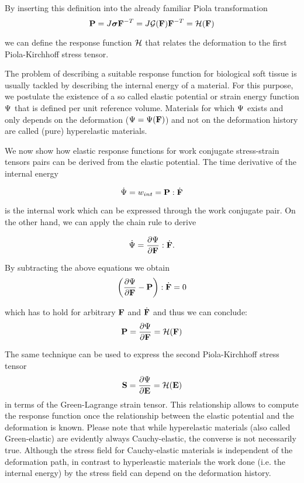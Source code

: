 By inserting this definition into the already familiar Piola transformation 
 \begin{equation}
\mathbf {P}  = J \boldsymbol{\sigma} \mathbf {F } ^{-T} =   J \mathcal{G}(\mathbf {F }) \mathbf {F } ^{-T} = \mathcal H  (\mathbf {F })
\end{equation}

we can define the response function $\mathcal H $ that relates the deformation to the first Piola-Kirchhoff stress tensor. 

The problem of describing a suitable response function for biological soft tissue is usually tackled by describing the internal energy of a material. For this purpose, we postulate the existence of a so called elastic potential or strain energy function $\Psi$ that is defined per unit reference volume. Materials for which $\Psi$ exists and only depends on the deformation ($\Psi = \Psi(\mathbf {F })$) and not on the deformation history are called (pure) hyperelastic materials.  

We now show how elastic response functions for work conjugate stress-strain tensors pairs can be derived from the elastic potential. The time derivative of the internal energy

 \begin{equation}
\dot {\Psi} = w_{int} = \mathbf {P}  : \dot{\mathbf {F }} 
\end{equation}

is the internal work which can be expressed through the work conjugate pair. On the other hand, we can apply the chain rule to derive

 \begin{equation}
\dot {\Psi} = \frac{\partial \Psi}{\partial \mathbf {F }} : \dot{\mathbf {F }} .
\end{equation}

By subtracting the above equations we obtain
 \begin{equation}
\left( \frac{\partial \Psi}{\partial \mathbf {F }} - \mathbf {P}  \right) : \dot{\mathbf {F }}  = 0
\end{equation}

which has to hold for arbitrary $\mathbf {F }$ and $\dot{\mathbf {F }} $ and thus we can conclude:
 \begin{equation}
\mathbf {P}  = \frac{\partial \Psi}{\partial \mathbf {F }} = \mathcal H  (\mathbf {F })
\end{equation}

The same technique can be used to express the second Piola-Kirchhoff stress tensor
 \begin{equation}
\mathbf {S}  = \frac{\partial \Psi}{\partial \mathbf {E} }  = \mathcal H  (\mathbf {E} )
\end{equation}
in terms of the Green-Lagrange strain tensor. This relationship allows to compute the response function once the relationship between the elastic potential and the deformation is known. Please note that while hyperelastic materials (also called Green-elastic) are evidently always Cauchy-elastic, the converse is not necessarily true. Although the stress field for Cauchy-elastic materials is independent of the deformation path, in contrast to hyperleastic materials the work done (i.e. the internal energy) by the stress field can depend on the deformation history. 

